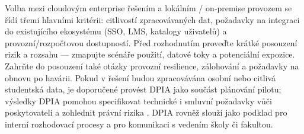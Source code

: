 Volba mezi cloudovým enterprise řešením a lokálním / on‑premise provozem se řídí třemi hlavními kritérii: citlivostí zpracovávaných dat, požadavky na integraci do existujícího ekosystému (SSO, LMS, katalogy uživatelů) a provozní/rozpočtovou dostupností. Před rozhodnutím proveďte krátké posouzení rizik a rozsahu — zmapujte scénáře použití, datové toky a potenciální expozice. Zahrňte do posouzení také otázky provozní resilience, zálohování a požadavky na obnovu po havárii. Pokud v řešení budou zpracovávána osobní nebo citlivá studentská data, je doporučené provést DPIA jako součást plánování pilotu; výsledky DPIA pomohou specifikovat technické i smluvní požadavky vůči poskytovateli a zohlednit právní rizika \cite{kb_malinka_chatgpt_ve_vyuce_dva_roky_pote_2024_pdf_90bc3aaf_page_12_1}. DPIA rovněž slouží jako podklad pro interní rozhodovací procesy a pro komunikaci s vedením školy či fakultou.

